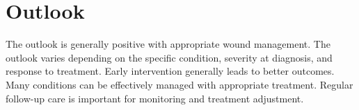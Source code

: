 \section{Outlook}
The outlook is generally positive with appropriate wound management. The outlook varies depending on the specific condition, severity at diagnosis, and response to treatment. Early intervention generally leads to better outcomes. Many conditions can be effectively managed with appropriate treatment. Regular follow-up care is important for monitoring and treatment adjustment.
